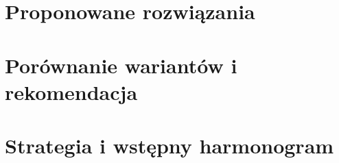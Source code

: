 \documentclass[a4paper,10pt]{article}
\begin{document}
\section{Proponowane rozwiązania}


\section{Porównanie wariantów i rekomendacja}

\section{Strategia i wstępny harmonogram}


\clearpage
{}
{}

\end{document}
